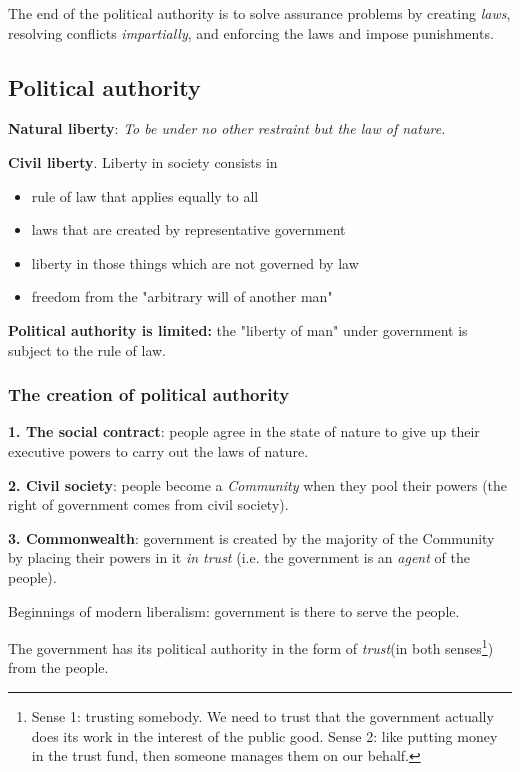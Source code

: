 The end of the political authority is to solve assurance problems by creating
\textit{laws}, resolving conflicts \textit{impartially}, and enforcing the laws
and impose punishments.

\subsection{Political authority}

\textbf{Natural liberty}: \textit{To be under no other restraint but the law of
nature.}

\textbf{Civil liberty}. Liberty in society consists in 
\begin{itemize}
    \item rule of law that applies equally to all
    \item laws that are created by representative government
    \item liberty in those things which are not governed by law
    \item freedom from the "arbitrary will of another man"
\end{itemize}

\textbf{Political authority is limited:} the "liberty of man" under government
is subject to the rule of law.

\subsubsection{The creation of political authority}

\textbf{1. The social contract}: people agree in the state of nature to give up
their executive powers to carry out the laws of nature.

\textbf{2. Civil society}: people become a \textit{Community} when they pool
their powers (the right of government comes from civil society).

\textbf{3. Commonwealth}: government is created by the majority of the
Community by placing their powers in it \textit{in trust} (i.e. the government
is an \textit{agent} of the people).

Beginnings of modern liberalism: government is there to serve the people.

The government has its political authority in the form of \textit{trust}(in
both senses\footnote{
    Sense 1: trusting somebody. We need to trust that the government
    actually does its work in the interest of the public good.
    Sense 2: like putting money in the trust fund, then someone manages them on
    our behalf.
}) from the people.

